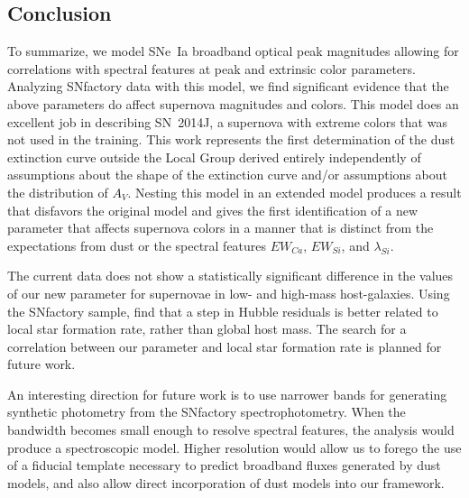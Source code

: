 \documentclass{aastex61}   	%
\begin{document}
\subsection{Conclusion}
To summarize, we model SNe~Ia broadband optical peak magnitudes allowing for correlations with spectral features at peak and
extrinsic color parameters.  Analyzing SNfactory data with this model, we find significant evidence that the above parameters do
affect supernova magnitudes and colors.  This model  does an excellent job in
describing SN~2014J, a supernova with extreme colors that was not used in the training.  
This work represents the first determination of the dust extinction curve outside the Local Group
derived entirely independently of assumptions about the shape of the extinction curve and/or assumptions about the
distribution of $A_V$.  
\color{purple}
Nesting this model in an extended model produces a result that 
\color{black}
disfavors the original model and gives the first identification of  a new parameter that affects supernova
colors in a manner that is distinct from the expectations from dust or the spectral features $EW_{Ca}$, $EW_{Si}$, and $\lambda_{Si}$.

\color{purple}
The current data does not show a statistically significant difference in the values of our new parameter for supernovae
in low- and high-mass host-galaxies.
Using the SNfactory sample,
\citet{2013A&A...560A..66R,2017Rigault} find that a step in Hubble residuals is better related to local star formation rate, rather than
global host mass.  The search for a correlation between our parameter and local star formation rate is planned for future work.
\color{black}

An interesting direction for future work is to use narrower bands for generating synthetic photometry
from the SNfactory spectrophotometry.  When the bandwidth becomes small enough
to resolve spectral features, the analysis would produce a spectroscopic model.   Higher resolution would allow us to forego 
the use of a fiducial template necessary to predict broadband fluxes generated by dust models, and also allow direct incorporation
of dust models into our framework.
\end{document}
